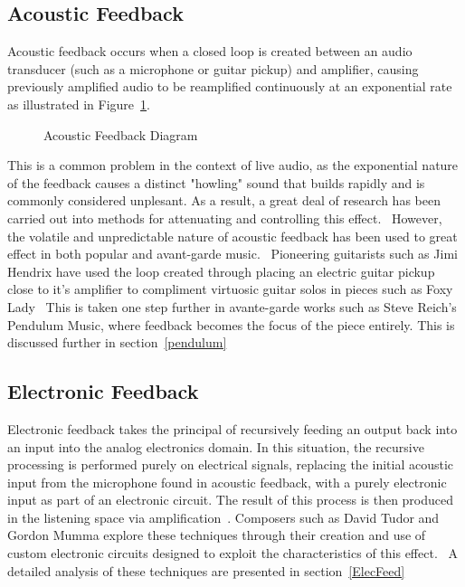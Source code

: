 \documentclass[titlepage]{scrartcl}
\begin{document}
    \subsection{Acoustic Feedback}
    Acoustic feedback occurs when a closed loop is created between an audio
    transducer (such as a microphone or guitar pickup) and amplifier,
    causing previously amplified audio to be reamplified continuously at an
    exponential rate as illustrated in Figure~\ref{acoustic_feedback}.\\
    \begin{figure}
        \caption[Caption for LOF]{Acoustic Feedback Diagram\protect\footnotemark}
        \label{acoustic_feedback}
    \end{figure}


    This is a common problem in the context of live audio, as the exponential
    nature of the feedback causes a distinct "howling" sound that builds
    rapidly and is commonly considered unplesant. As a result, a great deal of
    research has been carried out into methods for attenuating and controlling
    this effect.~\parencite[p.1]{waterschoot2010fyafc} However, the volatile
    and unpredictable nature of acoustic feedback has been used to great effect
    in both popular and avant-garde music.~\parencite[p.186]{holmes2012eaem}
    Pioneering guitarists such as Jimi Hendrix have used the loop created
    through placing an electric guitar pickup close to it's amplifier to
    compliment virtuosic guitar solos in pieces such as Foxy
    Lady~\citeyearpar{} This is taken one step further in avante-garde works
    such as Steve Reich's Pendulum Music, where feedback becomes the focus of
    the piece entirely. This is discussed further in section~\ref{pendulum}
    
    \subsection{Electronic Feedback}
    Electronic feedback takes the principal of recursively feeding an output
    back into an input into the analog electronics domain. In this situation,
    the recursive processing is performed purely on electrical signals,
    replacing the initial acoustic input from the microphone found in acoustic
    feedback, with a purely electronic input as part of an electronic circuit.
    The result of this process is then produced in the listening space via
    amplification~\parencite[p.187]{holmes2012eaem}. Composers such as David
    Tudor and Gordon Mumma explore these techniques through their creation and
    use of custom electronic circuits designed to exploit the characteristics
    of this effect.~\parencite[p.186, 390]{holmes2012eaem} A detailed analysis
    of these techniques are presented in section~\ref{ElecFeed}\\
\end{document}
